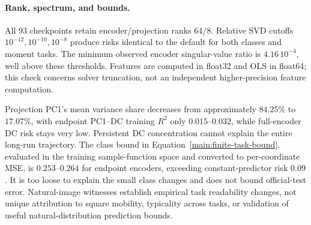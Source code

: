 \paragraph{Rank, spectrum, and bounds.}
All 93 checkpoints retain encoder/projection ranks $64/8$. Relative SVD cutoffs $10^{-12},10^{-10},10^{-8}$ produce risks identical to the default for both classes and moment tasks. The minimum observed encoder singular-value ratio is $4.16\,10^{-4}$, well above these thresholds. Features are computed in float32 and OLS in float64; this check concerns solver truncation, not an independent higher-precision feature computation.

Projection PC1's mean variance share decreases from approximately $84.25\%$ to $17.07\%$, with endpoint PC1--DC training $R^2$ only $0.015$--$0.032$, while full-encoder DC risk stays very low. Persistent DC concentration cannot explain the entire long-run trajectory. The class bound in Equation~\eqref{main:finite-task-bound}, evaluated in the training sample-function space and converted to per-coordinate MSE, is $0.253$--$0.264$ for endpoint encoders, exceeding constant-predictor risk $0.09$. It is too loose to explain the small class changes and does not bound official-test error. Natural-image witnesses establish empirical task readability changes, not unique attribution to square mobility, typicality across tasks, or validation of useful natural-distribution prediction bounds.

